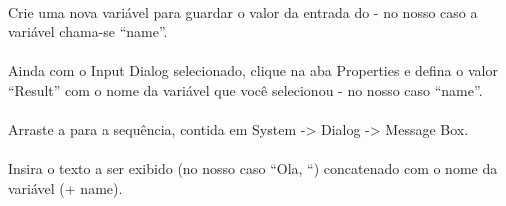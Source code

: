\documentclass[letterpaper,10pt,brazil]{sphinxmanual}
\begin{document}
\begin{figure}[htbp]
\centering

\noindent{}
\end{figure}


\paragraph{}
\label{\detokenize{exercise_1:vi-crie-uma-nova-variavel-para-guardar-o-valor-da-entrada}}
Crie uma nova variável para guardar o valor da entrada do  - no nosso caso a variável chama-se “name”.

\begin{figure}[htbp]
\centering

\noindent{}
\end{figure}


\paragraph{}
\label{\detokenize{exercise_1:vii-configure-a-saida-do-input-dialog}}
Ainda com o Input Dialog selecionado, clique na aba Properties e defina o valor “Result” com o nome da variável que você selecionou - no nosso caso “name”.

\begin{figure}[htbp]
\centering

\noindent{}
\end{figure}


\paragraph{}
\label{\detokenize{exercise_1:vii-insira-message-box-na-sequencia}}
Arraste a  para a sequência, contida em System -\textgreater{} Dialog -\textgreater{} Message Box.

\begin{figure}[htbp]
\centering

\noindent{}
\end{figure}


\paragraph{}
\label{\detokenize{exercise_1:viii-inserir-texto-na-message-box}}
Insira o texto a ser exibido (no nosso caso “Ola, “) concatenado com o nome da variável (+ name).
\end{document}
